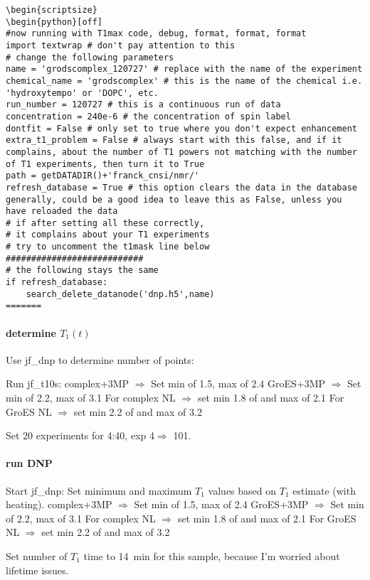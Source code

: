 \begin{scriptsize}
\begin{python}[off]
\begin{scriptsize}
\begin{lstlisting}
\begin{scriptsize}
\begin{python}[off]
#now running with T1max code, debug, format, format, format
import textwrap # don't pay attention to this
# change the following parameters
name = 'grodscomplex_120727' # replace with the name of the experiment
chemical_name = 'grodscomplex' # this is the name of the chemical i.e. 'hydroxytempo' or 'DOPC', etc.
run_number = 120727 # this is a continuous run of data
concentration = 240e-6 # the concentration of spin label
dontfit = False # only set to true where you don't expect enhancement
extra_t1_problem = False # always start with this false, and if it complains, about the number of T1 powers not matching with the number of T1 experiments, then turn it to True
path = getDATADIR()+'franck_cnsi/nmr/'
refresh_database = True # this option clears the data in the database generally, could be a good idea to leave this as False, unless you have reloaded the data
# if after setting all these correctly,
# it complains about your T1 experiments
# try to uncomment the t1mask line below
###########################
# the following stays the same
if refresh_database:
    search_delete_datanode('dnp.h5',name)
=======
\end{lstlisting}
\end{scriptsize}

\paragraph{determine $T_1(t)$}
Use jf\_dnp to determine number of points:

Run jf\_t10s:
complex+3MP $\Rightarrow$ Set min of 1.5, max of 2.4
GroES+3MP $\Rightarrow$ Set min of 2.2, max of 3.1
For complex NL $\Rightarrow$ set min 1.8 of and max of 2.1
For GroES NL $\Rightarrow$ set min 2.2 of and max of 3.2

Set 20 experiments for 4:40, exp 4$\Rightarrow$ 101.

\paragraph{run DNP}
Start jf\_dnp: Set minimum and maximum $T_1$ values based on $T_1$ estimate (with heating).
complex+3MP $\Rightarrow$ Set min of 1.5, max of 2.4
GroES+3MP $\Rightarrow$ Set min of 2.2, max of 3.1
For complex NL $\Rightarrow$ set min 1.8 of and max of 2.1
For GroES NL $\Rightarrow$ set min 2.2 of and max of 3.2

Set number of $T_1$ time to 14~min for this sample, because I'm worried about lifetime issues.


\end{python}
\end{scriptsize}
